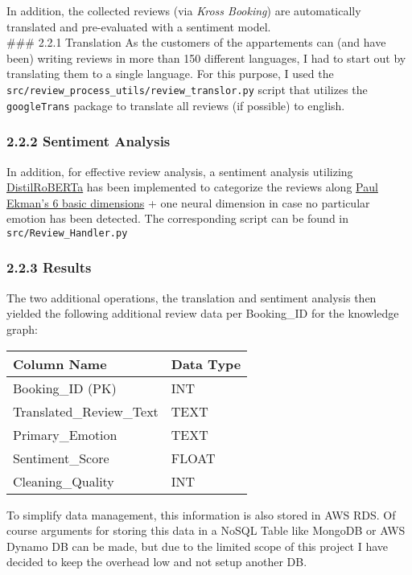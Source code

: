 In addition, the collected reviews (via \emph{Kross Booking}) are
automatically translated and pre-evaluated with a sentiment model.\\
\#\#\# 2.2.1 Translation As the customers of the appartements can (and
have been) writing reviews in more than 150 different languages, I had
to start out by translating them to a single language. For this purpose,
I used the \texttt{src/review\_process\_utils/review\_translor.py}
script that utilizes the \texttt{googleTrans} package to translate all
reviews (if possible) to english.

\subsubsection{2.2.2 Sentiment Analysis}\label{sentiment-analysis}

In addition, for effective review analysis, a sentiment analysis
utilizing
\href{https://huggingface.co/j-hartmann/emotion-english-distilroberta-base}{DistilRoBERTa}
has been implemented to categorize the reviews along
\href{https://www.paulekman.com/wp-content/uploads/2013/07/Basic-Emotions.pdf}{Paul
Ekman's 6 basic dimensions} + one neural dimension in case no particular
emotion has been detected. The corresponding script can be found in
\texttt{src/Review\_Handler.py}

\subsubsection{2.2.3 Results}\label{results}

The two additional operations, the translation and sentiment analysis
then yielded the following additional review data per Booking\_ID for
the knowledge graph:

\begin{longtable}[]{@{}ll@{}}
\toprule\noalign{}
Column Name & Data Type \\
\midrule\noalign{}
\endhead
\bottomrule\noalign{}
\endlastfoot
Booking\_ID (PK) & INT \\
Translated\_Review\_Text & TEXT \\
Primary\_Emotion & TEXT \\
Sentiment\_Score & FLOAT \\
Cleaning\_Quality & INT \\
\end{longtable}

To simplify data management, this information is also stored in AWS RDS.
Of course arguments for storing this data in a NoSQL Table like MongoDB
or AWS Dynamo DB can be made, but due to the limited scope of this
project I have decided to keep the overhead low and not setup another
DB.

